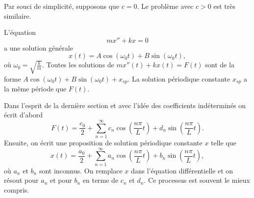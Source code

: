 Par souci de simplicité, supposons que $ c = 0 $. Le problème avec $ c> 0 $ est très
similaire.

L'équation
\begin{equation*}
mx'' + kx = 0 
\end{equation*}
a une solution générale
\begin{equation*}
x(t) = A \cos (\omega_0 t) + 
B \sin (\omega_0 t) ,
\end{equation*}
où $\omega_0 = \sqrt{\frac{k}{m}}$.
Toutes les solutions de
$mx''(t) + kx(t) = F(t)$ sont de la forme
$A \cos (\omega_0 t) + B \sin (\omega_0 t) + x_{sp}$.
La solution périodique constante $x_{sp}$ a la même période que  $F(t)$.

Dans l'esprit de la dernière section et avec l'idée des coefficients indéterminés
on écrit d'abord
\begin{equation*}
F(t) = \frac{c_0}{2} + \sum_{n=1}^\infty
c_n \cos \left( \frac{n \pi}{L} t \right) +
d_n \sin \left( \frac{n \pi}{L} t \right) .
\end{equation*}
Ensuite, on écrit une proposition de solution périodique constante $x$ telle que
\begin{equation*}
x(t) = \frac{a_0}{2} + \sum_{n=1}^\infty
a_n \cos \left( \frac{n \pi}{L} t \right) +
b_n \sin \left( \frac{n \pi}{L} t \right) ,
\end{equation*}
où $a_n$ et $b_n$ sont inconnus.
On remplace $x$ dans l'équation différentielle et on résout pour $a_n$ et pour
$b_n$ en terme de $c_n$ et $d_n$.  Ce processus
est souvent le mieux compris.
\pagebreak[2]

